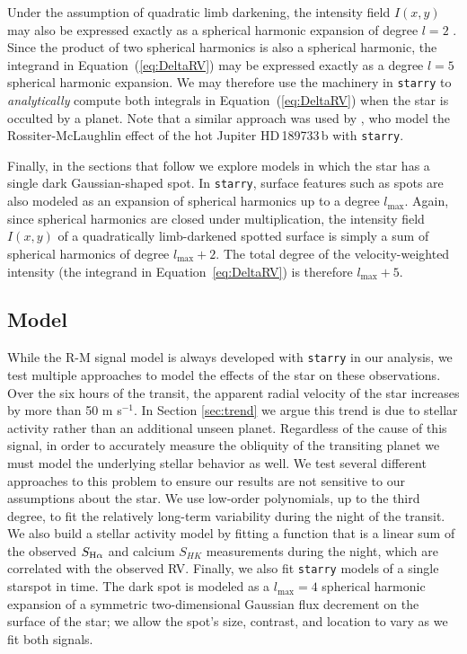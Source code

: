 \documentclass[twocolumn]{aastex63}
\begin{document}
Under the assumption of quadratic limb darkening, the intensity field $I(x, y)$ may also be expressed exactly as a spherical harmonic expansion of degree $l=2$ \citep{Luger19}. Since the product of two spherical harmonics is also a spherical harmonic, the integrand in Equation~(\ref{eq:DeltaRV}) may be expressed exactly as a degree $l=5$ spherical harmonic expansion. We may therefore use the machinery in \texttt{starry} to \emph{analytically} compute both integrals in Equation~(\ref{eq:DeltaRV}) when the star is occulted by a planet. 
Note that a similar approach was used by \citet{Bedell19}, who model the Rossiter-McLaughlin effect of the hot Jupiter HD\,189733\,b with \texttt{starry}.

Finally, in the sections that follow we explore models in which the star has a single dark Gaussian-shaped spot. In \texttt{starry}, surface features such as spots are also modeled as an expansion of spherical harmonics up to a degree $l_\mathrm{max}$. Again, since spherical harmonics are closed under multiplication, the intensity field $I(x, y)$ of a quadratically limb-darkened spotted surface is simply a sum of spherical harmonics of degree $l_\mathrm{max} + 2$. The total degree of the velocity-weighted intensity (the integrand in Equation~\ref{eq:DeltaRV}) is therefore $l_\mathrm{max} + 5$.

\subsection{Model}
\label{sec:model}

While the R-M signal model is always developed with \texttt{starry} in our analysis, we test multiple approaches to model the effects of the star on these observations.
Over the six hours of the transit, the apparent radial velocity of the star increases by more than 50 m s$^{-1}$. 
In Section \ref{sec:trend} we argue this trend is due to stellar activity rather than an additional unseen planet.
Regardless of the cause of this signal, in order to accurately measure the obliquity of the transiting planet we must model the underlying stellar behavior as well.
We test several different approaches to this problem to ensure our results are not sensitive to our assumptions about the star.
We use low-order polynomials, up to the third degree, to fit the relatively long-term variability during the night of the transit. 
We also build a stellar activity model by fitting a function that is a linear sum of the observed $S_{\rm H\alpha}$ and calcium $S_{HK}$ measurements during the night, which are correlated with the observed RV.
Finally, we also fit \texttt{starry} models of a single starspot in time. The dark spot is modeled as a $l_\mathrm{max} = 4$ spherical harmonic expansion of a symmetric two-dimensional Gaussian flux decrement on the surface of the star; we allow the spot's size, contrast, and location to vary as we fit both signals.
\end{document}
